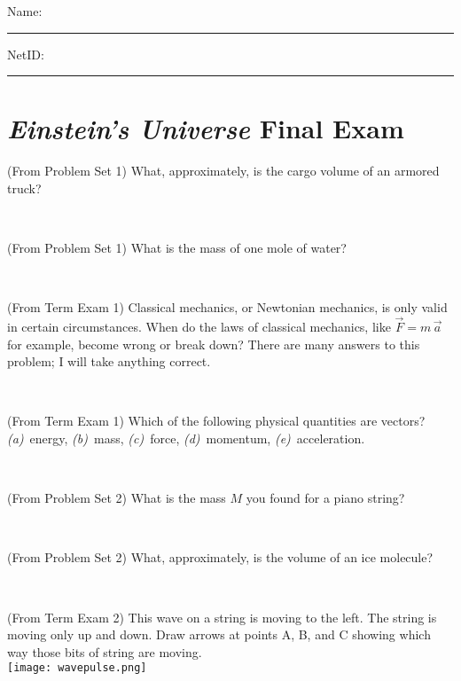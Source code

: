 \documentclass[12pt, letterpaper]{article}
\begin{document}
\noindent
Name: \rule[-1ex]{0.60\textwidth}{0.1pt}
NetID: \rule[-1ex]{0.20\textwidth}{0.1pt}

\section*{\textsl{Einstein's Universe} Final Exam}
\setcounter{problem}{1}

\begin{problem}
  (From Problem Set 1)
  What, approximately, is the cargo volume of an armored truck?
\end{problem}

\vfill ~

\begin{problem}
  (From Problem Set 1)
  What is the mass of one mole of water?
\end{problem}

\vfill ~

\begin{problem}
  (From Term Exam 1)
  Classical mechanics, or Newtonian mechanics, is only valid in certain
circumstances. When do the laws of classical mechanics, like $\vec{F} =
m\,\vec{a}$ for example, become wrong or break down? There are many answers
to this problem; I will take anything correct.
\end{problem}

\vfill ~

\begin{problem}
  (From Term Exam 1)
  Which of the following physical quantities are vectors?
\\
\textsl{(a)}~energy,
\textsl{(b)}~mass,
\textsl{(c)}~force,
\textsl{(d)}~momentum,
\textsl{(e)}~acceleration.
\end{problem}

\vfill ~

\clearpage

\begin{problem}
  (From Problem Set 2)
  What is the mass $M$ you found for a piano string?
\end{problem}

\vfill ~

\begin{problem}
  (From Problem Set 2)
  What, approximately, is the volume of an ice molecule?
\end{problem}

\vfill ~

\begin{problem}
  (From Term Exam 2)
  This wave on a string is moving to the left. The string is moving only
up and down. Draw arrows at points A, B, and C showing which way those
bits of string are moving.\\
\texttt{[image: wavepulse.png]}
\end{problem}
\end{document}
